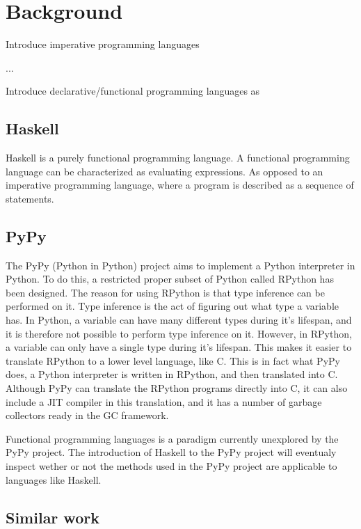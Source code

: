 
\chapter{Background}


Introduce imperative programming languages

...

Introduce declarative/functional programming languages as 



\section*{Haskell}

Haskell is a purely functional programming language. A functional programming language
can be characterized as evaluating expressions. As opposed to an imperative 
programming language, where a program is described as a sequence of statements.



\section*{PyPy}

The PyPy (Python in Python) project aims to implement a Python interpreter in Python.
To do this, a restricted proper subset of Python called RPython has been designed.
The reason for using RPython is that type inference can be performed on it. Type
inference is the act of figuring out what type a variable has. In Python, a variable
can have many different types during it's lifespan, and it is therefore not possible
to perform type inference on it. However, in RPython, a variable can only have a 
single type during it's lifespan. This makes it easier to translate RPython to a lower
level language, like C. This is in fact what PyPy does, a Python interpreter is written
in RPython, and then translated into C. Although PyPy can translate the RPython programs
directly into C, it can also include a JIT compiler in this translation, and it has
a number of garbage collectors ready in the GC framework.



Functional programming languages is a paradigm currently
unexplored by the PyPy project. The introduction of Haskell
to the PyPy project will eventualy inspect wether or not 
the methods used in the PyPy project are applicable to languages
like Haskell.


\section*{Similar work}
